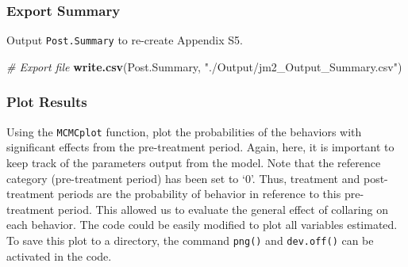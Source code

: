 \documentclass[]{article}
\newenvironment{Shaded}{\begin{snugshade}}{\end{snugshade}}
\newcommand{\CommentTok}[1]{\textcolor[rgb]{0.56,0.35,0.01}{\textit{#1}}}
\newcommand{\KeywordTok}[1]{\textcolor[rgb]{0.13,0.29,0.53}{\textbf{#1}}}
\newcommand{\NormalTok}[1]{#1}
\newcommand{\StringTok}[1]{\textcolor[rgb]{0.31,0.60,0.02}{#1}}
\begin{document}
\hypertarget{export-summary}{%
\subsubsection{Export Summary}\label{export-summary}}

Output \texttt{Post.Summary} to re-create Appendix S5.

\begin{Shaded}
\begin{Highlighting}[]
\CommentTok{# Export file}
\KeywordTok{write.csv}\NormalTok{(Post.Summary, }\StringTok{"./Output/jm2_Output_Summary.csv"}\NormalTok{)}
\end{Highlighting}
\end{Shaded}

\hypertarget{plot-results}{%
\subsubsection{Plot Results}\label{plot-results}}

Using the \texttt{MCMCplot} function, plot the probabilities of the
behaviors with significant effects from the pre-treatment period. Again,
here, it is important to keep track of the parameters output from the
model. Note that the reference category (pre-treatment period) has been
set to `0'. Thus, treatment and post-treatment periods are the
probability of behavior in reference to this pre-treatment period. This
allowed us to evaluate the general effect of collaring on each behavior.
The code could be easily modified to plot all variables estimated. To
save this plot to a directory, the command \texttt{png()} and
\texttt{dev.off()} can be activated in the code.
\end{document}
